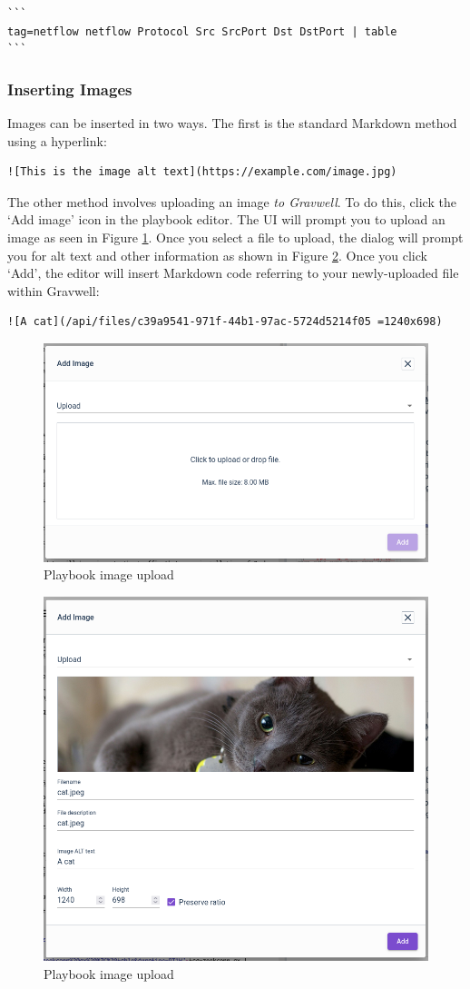 \begin{verbatim}
```
tag=netflow netflow Protocol Src SrcPort Dst DstPort | table
```
\end{verbatim}

\subsubsection{Inserting Images}

Images can be inserted in two ways. The first is the standard Markdown method using a hyperlink:

\begin{verbatim}
![This is the image alt text](https://example.com/image.jpg)
\end{verbatim}

The other method involves uploading an image \emph{to Gravwell}. To do this, click the `Add image' icon in the playbook editor. The UI will prompt you to upload an image as seen in Figure \ref{fig:playbook-upload}. Once you select a file to upload, the dialog will prompt you for alt text and other information as shown in Figure \ref{fig:playbook-upload2}. Once you click `Add', the editor will insert Markdown code referring to your newly-uploaded file within Gravwell:

\begin{verbatim}
![A cat](/api/files/c39a9541-971f-44b1-97ac-5724d5214f05 =1240x698)
\end{verbatim}

\begin{figure}[H]
	\includegraphics[width=0.6\linewidth]{images/playbook-upload.png}
	\caption{Playbook image upload}
	\label{fig:playbook-upload}
\end{figure}

\begin{figure}[H]
	\includegraphics[width=0.6\linewidth]{images/playbook-upload2.png}
	\caption{Playbook image upload}
	\label{fig:playbook-upload2}
\end{figure}

